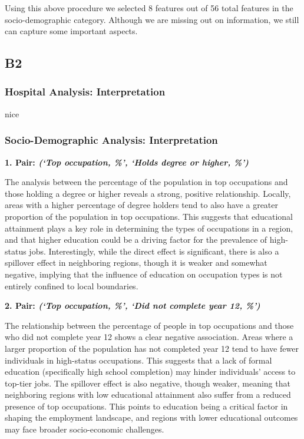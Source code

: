 \documentclass[
	a4paper, %
	10pt, %
	unnumberedsections, %
	twoside, %
]{LTJournalArticle}
\begin{document}
Using this above procedure we selected 8 features out of 56 total features in the socio-demographic category. Although we are missing out on information, we still can capture some important aspects.


\subsection{B2}

\subsubsection{Hospital Analysis: Interpretation}

nice

\subsubsection{Socio-Demographic Analysis: Interpretation}\leavevmode

\textbf{1. Pair: \textit{(‘Top occupation, \%’, ‘Holds degree or higher, \%’)}} 

The analysis between the percentage of the population in top occupations and those holding a degree or higher reveals a strong, positive relationship. Locally, areas with a higher percentage of degree holders tend to also have a greater proportion of the population in top occupations. This suggests that educational attainment plays a key role in determining the types of occupations in a region, and that higher education could be a driving factor for the prevalence of high-status jobs. Interestingly, while the direct effect is significant, there is also a spillover effect in neighboring regions, though it is weaker and somewhat negative, implying that the influence of education on occupation types is not entirely confined to local boundaries.

\textbf{2. Pair: \textit{(‘Top occupation, \%’, ‘Did not complete year 12, \%’)}} 

The relationship between the percentage of people in top occupations and those who did not complete year 12 shows a clear negative association. Areas where a larger proportion of the population has not completed year 12 tend to have fewer individuals in high-status occupations. This suggests that a lack of formal education (specifically high school completion) may hinder individuals’ access to top-tier jobs. The spillover effect is also negative, though weaker, meaning that neighboring regions with low educational attainment also suffer from a reduced presence of top occupations. This points to education being a critical factor in shaping the employment landscape, and regions with lower educational outcomes may face broader socio-economic challenges.
\end{document}
